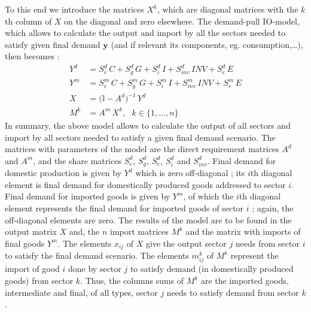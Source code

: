 \documentclass[12pt,english]{article}
\begin{document}
To this end we introduce the matrices $X^k$, which are diagonal matrices with the $k$th column of $X$ on the diagonal and zero elsewhere. The demand-pull IO-model, which allows to calculate the output and import by all the sectors needed to satisfy given final demand $\boldsymbol{y}$ (and if relevant its components, eg. consumption,\ldots), then becomes :
\begin{align}
Y^d &= S^d_{c} \, C + S^d_{g} \, G + S^d_{i} \, I + S^d_{inv} \, INV + S^d_{e} \, E \label{IOmodel_Yd} \\
Y^m &= S^m_{c} \,C + S^m_{g}\, G + S^m_{i}\, I + S^m_{inv}\, INV + S^m_{e}\, E 		\label{IOmodel_Ym} \\
X &= \big(\mathbb{I} - A^d \big)^{-1} \, Y^d  										\label{IOmodel_X} \\
M^k &= A^m \, X^k, \ \ \  k \in \{1,\ldots,n\} 							\label{IOmodel_Mk}
\end{align}
In summary, the above model allows to calculate the output of all sectors and import by all sectors needed to satisfy a given final demand scenario. The matrices with parameters of the model are the direct requirement matrices $A^d$ and $A^m$, and the share matrices $S^d_{c}$, $S^d_{g}$, $S^d_{e}$, $S^d_{i}$ and $S^d_{inv}$. Final demand for domestic production is given by $Y^d$ which is zero off-diagonal ; its $i$th diagonal element is final demand for domestically produced goods addressed to sector $i$. Final demand for imported goods is given by $Y^m$, of which the $i$th diagonal element represents the final demand for imported goods of sector $i$ ; again, the off-diagonal elements are zero. The results of the model are to be found in the output matrix $X$ and, the $n$ import matrices $M^k$ and the matrix with imports of final goods $Y^m$. The elements $x_{ij}$ of $X$ give the output sector $j$ needs from sector $i$ to satisfy the final demand scenario. The elements $m^k_{ij}$ of $M^k$ represent the import of good $i$ done by sector $j$ to satisfy demand (in domestically produced goods) from sector $k$. Thus, the columns sums of $M^k$ are the imported goods, intermediate and final, of all types, sector $j$ needs to satisfy demand from sector $k$.


\end{document}
